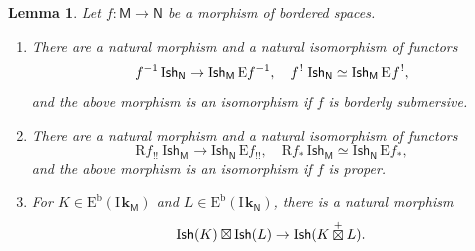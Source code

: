 \documentclass[11pt]{article}
\numberwithin{equation}{section}
\newenvironment{enumeratei}
{\bgroup\def\theenumi{\roman{enumi}}\def\theenumii{\alph{enumii}}\begin{enumerate}}
{\end{enumerate}\egroup}
\theoremstyle{plain}
\newtheorem{lemma}[theorem]{Lemma}
\theoremstyle{definition}
\newcommand{\derived}[1]{\mathrm{#1}}
\newcommand{\dere}{\derived{E}}\let\enh\dere
\newcommand{\derr}{\derived{R}}
\newcommand{\BEC}[2][\ifield]{\dere^{\mathrm{b}}(#1_{#2})}
\newcommand{\roim}[1]{\derr#1_*}
\newcommand{\reeim}[1]{\derr#1_{\mspace{1mu}!!}\mspace{1mu}}
\newcommand{\epb}[1]{#1^{\mspace{1.5mu}!}\mspace{2mu}}
\newcommand{\etens}[1][]{\mathbin{\boxtimes_{\raise1.5ex\hbox to-.1em{}#1}}}
\newcommand{\Eopb}[1]{\enh#1^{-1}}
\newcommand{\Eoim}[1]{\enh#1_*}
\newcommand{\Eeeim}[1]{\enh#1_{!!}}
\newcommand{\Eepb}[1]{\enh\mspace{1mu}#1^{\mspace{1.5mu}!}}
\newcommand{\field}{\mathbf{k}}\let\cor\field
\newcommand{\ind}{\mathrm{I}\mspace{2mu}}
\newcommand{\ifield}{\ind\field}
\newcommand{\cetens}{\mathbin{\mathop\boxtimes\limits^+}}
\newcommand{\Ish}{\mathrm{I}\mathsf{sh}}
\newcommand{\bbM}{\mathsf{M}}
\newcommand{\bbN}{\mathsf{N}}
\newcommand{\opb}[1]{#1^{-1}}
\begin{document}
\begin{lemma}\label{lem:ishop}
Let $f\colon \bbM\to \bbN$ be a morphism of bordered spaces.
\begin{enumeratei}
\item\label{lem:ishopi}
There are a natural morphism and a natural isomorphism of functors
\[
\opb f \, \Ish_{\bbN} \to \Ish_{\bbM} \, \Eopb f, \quad
\epb f \, \Ish_{\bbN} \simeq \Ish_{\bbM} \, \Eepb f,
\]
and the above morphism is an isomorphism if $f$ is borderly submersive.
\item\label{lem:ishopii}
There are a natural morphism and a natural isomorphism of functors
\[
\reeim f \, \Ish_{\bbM} \to \Ish_{\bbN} \, \Eeeim f, \quad
\roim f \, \Ish_{\bbM} \simeq \Ish_{\bbN} \, \Eoim f,
\]
and the above morphism is an isomorphism if $f$ is proper.
\item\label{lem:ishopiii}
For $K\in\BEC\bbM$ and $L\in\BEC\bbN$,
there is a natural morphism
\[
\Ish(K)\etens\Ish(L)\to\Ish(K\cetens L).
\]
\end{enumeratei}
\end{lemma}
\end{document}
